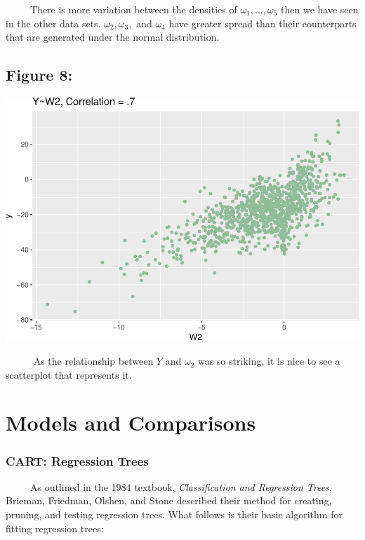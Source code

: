 \documentclass[12pt,twoside]{reedthesis}
\begin{document}
  ~~~~~There is more variation between the densities of
  \(\omega_1,...,\omega_5\) then we have seen in the other data sets.
  \(\omega_2,\omega_3,\) and \(\omega_4\) have greater spread than their
  counterparts that are generated under the normal distribution.
  
  \subsection{Figure 8:}\label{figure-8}
  
  \begin{center}\includegraphics{Thesis_files/figure-latex/fig8-1} \end{center}
  
  ~~~~~ As the relationship between \(Y\) and \(\omega_2\) was so
  striking, it is nice to see a scatterplot that represents it.
  
  \section{Models and Comparisons}\label{models-and-comparisons}
  
  \subsubsection{CART: Regression Trees}\label{cart-regression-trees}
  
  ~~~~~As outlined in the 1984 textbook, \emph{Classification and
  Regression Trees}, Brieman, Friedman, Olshen, and Stone described their
  method for creating, pruning, and testing regression trees. What follows
  is their basic algorithm for fitting regression trees:
  
\end{document}
